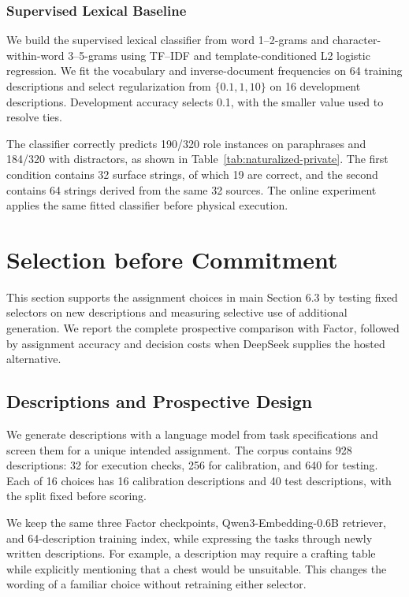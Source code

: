 \documentclass[sigconf,nonacm,balance=false]{aamas}
\begin{document}
\subsubsection{Supervised Lexical Baseline}

We build the supervised lexical classifier from word 1--2-grams and character-within-word 3--5-grams using TF--IDF and template-conditioned L2 logistic regression. We fit the vocabulary and inverse-document frequencies on 64 training descriptions and select regularization from $\{0.1,1,10\}$ on 16 development descriptions. Development accuracy selects 0.1, with the smaller value used to resolve ties.

The classifier correctly predicts 190/320 role instances on paraphrases and 184/320 with distractors, as shown in Table~\ref{tab:naturalized-private}. The first condition contains 32 surface strings, of which 19 are correct, and the second contains 64 strings derived from the same 32 sources. The online experiment applies the same fitted classifier before physical execution.

\section{Selection before Commitment}
\label{sec:supp-prospective-selection}

This section supports the assignment choices in main Section 6.3 by testing fixed selectors on new descriptions and measuring selective use of additional generation. We report the complete prospective comparison with Factor, followed by assignment accuracy and decision costs when DeepSeek supplies the hosted alternative.

\subsection{Descriptions and Prospective Design}
We generate descriptions with a language model from task specifications and screen them for a unique intended assignment. The corpus contains 928 descriptions: 32 for execution checks, 256 for calibration, and 640 for testing. Each of 16 choices has 16 calibration descriptions and 40 test descriptions, with the split fixed before scoring.

We keep the same three Factor checkpoints, Qwen3-Embedding-0.6B retriever, and 64-description training index, while expressing the tasks through newly written descriptions. For example, a description may require a crafting table while explicitly mentioning that a chest would be unsuitable. This changes the wording of a familiar choice without retraining either selector.
\end{document}
